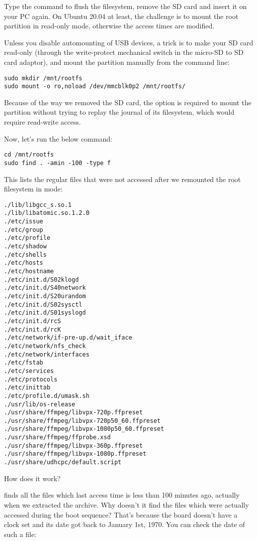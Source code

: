 Type the  command to flush the filesystem, remove the SD card
and insert it on your PC again. On Ubuntu 20.04 at least, the challenge
is to mount the root partition in read-only mode, otherwise the
access times are modified.

Unless you disable automounting of USB devices, a trick is to
make your SD card read-only (through the write-protect mechanical
switch in the micro-SD to SD card adaptor), and mount the partition
manually from the command line:

\begin{verbatim}
sudo mkdir /mnt/rootfs
sudo mount -o ro,noload /dev/mmcblk0p2 /mnt/rootfs/
\end{verbatim}

Because of the way we removed the SD card, the 
option is required to mount the partition without trying to
replay the journal of its filesystem, which would require
read-write access.

Now, let's run the below command:

\begin{verbatim}
cd /mnt/rootfs
sudo find . -amin -100 -type f
\end{verbatim}

This lists the regular files that were not accessed after we remounted
the root filesystem in  mode:

\begin{verbatim}
./lib/libgcc_s.so.1
./lib/libatomic.so.1.2.0
./etc/issue
./etc/group
./etc/profile
./etc/shadow
./etc/shells
./etc/hosts
./etc/hostname
./etc/init.d/S02klogd
./etc/init.d/S40network
./etc/init.d/S20urandom
./etc/init.d/S02sysctl
./etc/init.d/S01syslogd
./etc/init.d/rcS
./etc/init.d/rcK
./etc/network/if-pre-up.d/wait_iface
./etc/network/nfs_check
./etc/network/interfaces
./etc/fstab
./etc/services
./etc/protocols
./etc/inittab
./etc/profile.d/umask.sh
./usr/lib/os-release
./usr/share/ffmpeg/libvpx-720p.ffpreset
./usr/share/ffmpeg/libvpx-720p50_60.ffpreset
./usr/share/ffmpeg/libvpx-1080p50_60.ffpreset
./usr/share/ffmpeg/ffprobe.xsd
./usr/share/ffmpeg/libvpx-360p.ffpreset
./usr/share/ffmpeg/libvpx-1080p.ffpreset
./usr/share/udhcpc/default.script
\end{verbatim}

How does it work?

 finds all the files which last access time is
less than 100 minutes ago, actually when we extracted the archive.
Why doesn't it find the files which were actually accessed during the
boot sequence? That's because the board doesn't have a clock set and its
date got back to January 1st, 1970. You can check the date of such a
file:

